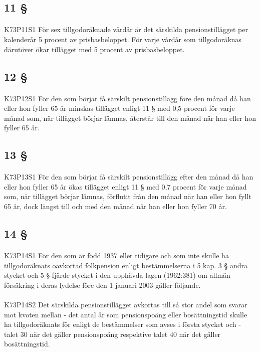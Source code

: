 \documentclass[a4paper,notitlepage,openany,10pt]{book}
\begin{document}
\subsection*{11 §}
\paragraph*{}
{\tiny K73P11S1}
För sex tillgodoräknade vårdår är det särskilda pensionstillägget per kalenderår 5 procent av prisbasbeloppet. För varje vårdår som tillgodoräknas därutöver ökar tillägget med 5 procent av prisbasbeloppet.
\subsection*{12 §}
\paragraph*{}
{\tiny K73P12S1}
För den som börjar få särskilt pensionstillägg före den månad då han eller hon fyller 65 år minskas tillägget enligt 11 § med 0,5 procent för varje månad som, när tillägget börjar lämnas, återstår till den månad när han eller hon fyller 65 år.
\subsection*{13 §}
\paragraph*{}
{\tiny K73P13S1}
För den som börjar få särskilt pensionstillägg efter den månad då han eller hon fyller 65 år ökas tillägget enligt 11 § med 0,7 procent för varje månad som, när tillägget börjar lämnas, förflutit från den månad när han eller hon fyllt 65 år, dock längst till och med den månad när han eller hon fyller 70 år.
\subsection*{14 §}
\paragraph*{}
{\tiny K73P14S1}
För den som är född 1937 eller tidigare och som inte skulle ha tillgodoräknats oavkortad folkpension enligt bestämmelserna i 5 kap. 3 § andra stycket och 5 § fjärde stycket i den upphävda lagen (1962:381) om allmän försäkring i deras lydelse före den 1 januari 2003 gäller följande.
\paragraph*{}
{\tiny K73P14S2}
Det särskilda pensionstillägget avkortas till så stor andel som svarar mot kvoten mellan
\newline - det antal år som pensionspoäng eller bosättningstid skulle ha tillgodoräknats för enligt de bestämmelser som avses i första stycket och
\newline - talet 30 när det gäller pensionspoäng respektive talet 40 när det gäller bosättningstid.
\end{document}
